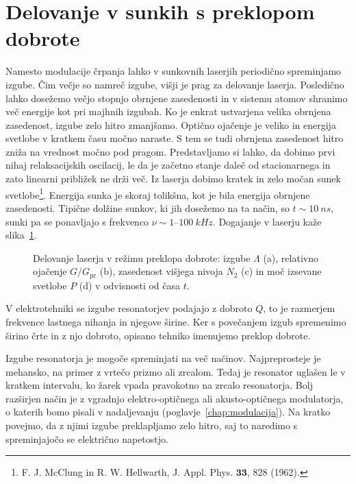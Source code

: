\section{Delovanje v sunkih s preklopom dobrote}
\label{qswitch}
Namesto modulacije črpanja lahko v sunkovnih laserjih periodično spreminjamo 
izgube. Čim večje so namreč izgube, višji 
je prag za delovanje laserja. 
Posledično lahko dosežemo večjo stopnjo obrnjene zasedenosti in v sistemu atomov shranimo več 
energije kot pri majhnih izgubah.
Ko je enkrat ustvarjena velika obrnjena zasedenost, izgube zelo hitro zmanjšamo. 
Optično ojačenje je veliko in energija svetlobe v kratkem času močno naraste. 
S tem se tudi obrnjena zasedenost hitro zniža na vrednost močno pod pragom.
Predstavljamo si lahko, da dobimo prvi nihaj relaksacijskih oscilacij, le da
je začetno stanje daleč od stacionarnega in zato linearni približek ne drži več.
Iz laserja dobimo kratek in zelo močan sunek svetlobe\footnote{F. J.
McClung in R. W. Hellwarth, J. Appl. Phys. $\mathbf{33}$, 828 (1962).}. Energija
sunka je skoraj tolikšna, kot je bila energija obrnjene zasedenosti. 
Tipične dolžine sunkov, ki jih dosežemo na ta način, so $t \sim 10~\si{ns}$, sunki
pa se ponavljajo s frekvenco $\nu \sim 1$--$100~\si{kHz}$.
Dogajanje v laserju kaže slika~\ref{fig:pulseQ}.
\begin{figure}[ht]
\centering
\def\svgwidth{95truemm} 

\caption{Delovanje laserja v režimu preklopa dobrote: izgube $\Lambda$ (a), relativno 
ojačenje $G/G_\mathrm{pr}$ (b), 
zasedenost višjega nivoja $N_2$ (c) in moč izsevane svetlobe $P$ (d) v odvisnosti od časa $t$.}
\label{fig:pulseQ}
\end{figure}
\begin{remark}
V elektrotehniki se izgube resonatorjev podajajo z dobroto $Q$, to je razmerjem
frekvence lastnega nihanja in njegove širine. Ker s povečanjem izgub spremenimo 
širino črte in z njo dobroto, opisano tehniko imenujemo preklop 
dobrote.
\end{remark}
Izgube resonatorja je mogoče spreminjati na več načinov. Najpreprosteje
je mehansko, na primer z vrtečo prizmo ali zrcalom. Tedaj je resonator uglašen le v kratkem
intervalu, ko žarek vpada pravokotno na zrcalo resonatorja. Bolj razširjen način 
je z vgradnjo elektro-optičnega ali akusto-optičnega modulatorja, o katerih
bomo pisali v nadaljevanju (poglavje~\ref{chap:modulacija}). Na kratko povejmo, 
da z njimi izgube preklapljamo zelo hitro, saj to naredimo s spreminjajočo se 
električno napetostjo.

